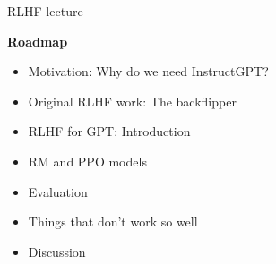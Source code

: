 \begin{vbframe}{RLHF lecture}

\vfill

\textbf{Roadmap}

	\begin{itemize}
		\item Motivation: Why do we need InstructGPT?
		\item Original RLHF work: The backflipper
                \item RLHF for GPT: Introduction 
                  \item RM and PPO models
                  \item Evaluation
                    \item Things that don't work so well
\item Discussion
	\end{itemize}

\vfill

\end{vbframe}
